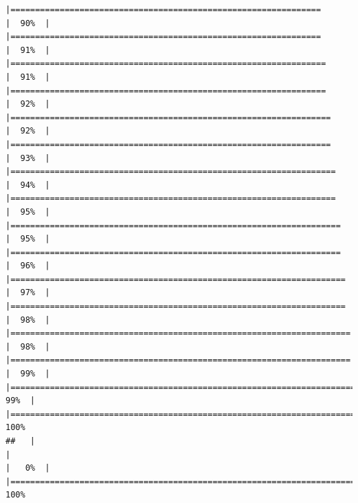 \documentclass[
  english,
  man,a4paper,mask,floatsintext]{apa6}
\begin{document}
\begin{verbatim}
|===============================================================       |  90%  |                                                                              |===============================================================       |  91%  |                                                                              |================================================================      |  91%  |                                                                              |================================================================      |  92%  |                                                                              |=================================================================     |  92%  |                                                                              |=================================================================     |  93%  |                                                                              |==================================================================    |  94%  |                                                                              |==================================================================    |  95%  |                                                                              |===================================================================   |  95%  |                                                                              |===================================================================   |  96%  |                                                                              |====================================================================  |  97%  |                                                                              |====================================================================  |  98%  |                                                                              |===================================================================== |  98%  |                                                                              |===================================================================== |  99%  |                                                                              |======================================================================|  99%  |                                                                              |======================================================================| 100%
##   |                                                                              |                                                                      |   0%  |                                                                              |======================================================================| 100%

\end{verbatim}
\end{document}

